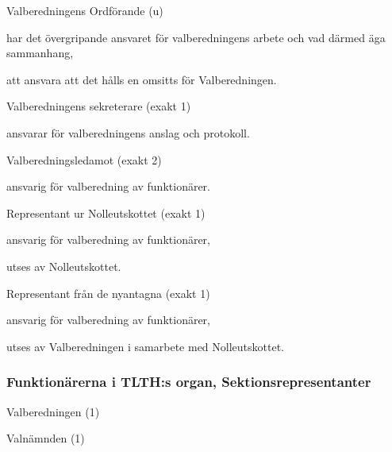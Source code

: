 \documentclass[10pt]{article}
\begin{document}
\begin{emptylist}
    \item Valberedningens Ordförande (u)
        \begin{dashlist}
            \item har det övergripande ansvaret för valberedningens arbete
                och vad därmed äga sammanhang,
            \item att ansvara att det hålls en omsitts för Valberedningen.
        \end{dashlist}
    \item Valberedningens sekreterare (exakt 1)
        \begin{dashlist}
            \item ansvarar för valberedningens anslag och protokoll.
        \end{dashlist}
    \item Valberedningsledamot (exakt 2)
        \begin{dashlist}
            \item ansvarig för valberedning av funktionärer.
        \end{dashlist}
    \item Representant ur Nolleutskottet (exakt 1)
        \begin{dashlist}
            \item ansvarig för valberedning av funktionärer,
            \item utses av Nolleutskottet.
        \end{dashlist}
    \item Representant från de nyantagna (exakt 1)
        \begin{dashlist}
            \item ansvarig för valberedning av funktionärer,
            \item utses av Valberedningen i samarbete med Nolleutskottet.
        \end{dashlist}
\end{emptylist}

\subsubsection{Funktionärerna i TLTH:s organ, Sektionsrepresentanter}
\begin{emptylist}
    \item Valberedningen (1)
    \item Valnämnden (1)
\end{emptylist}
\end{document}
